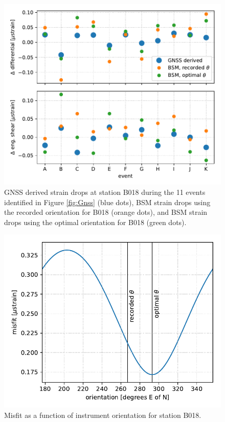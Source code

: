\begin{figure}
\includegraphics{ch5/appendix_figures/fit.pdf}
\caption{GNSS derived strain drops at station B018 during the 11
events identified in Figure \ref{fig:Gnss} (blue dots), BSM strain
drops using the recorded orientation for B018 (orange dots), and BSM
strain drops using the optimal orientation for B018 (green dots).}
\label{fig:Fit}
\end{figure}

\begin{figure}
\includegraphics{ch5/appendix_figures/misfit.pdf}
\caption{Misfit as a function of instrument orientation for station
B018.}
\label{fig:Misfit}
\end{figure}

